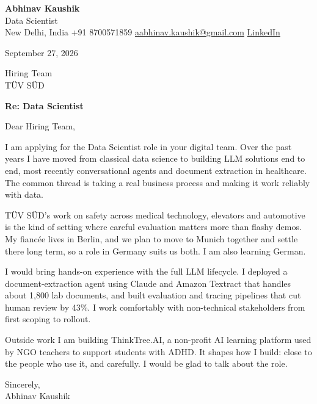 \documentclass[11pt,a4paper]{article}
\begin{document}
{\Large\bfseries Abhinav Kaushik}\\
Data Scientist\\
New Delhi, India \textbar{} +91 8700571859 \textbar{} \href{mailto:aabhinav.kaushik@gmail.com}{aabhinav.kaushik@gmail.com} \textbar{} \href{https://www.linkedin.com/in/abhinav-kaushik10/}{LinkedIn}  

September 27, 2026

Hiring Team\\
TÜV SÜD

\textbf{Re: Data Scientist}

Dear Hiring Team,

I am applying for the Data Scientist role in your digital team. Over the past years I have moved from classical data science to building LLM solutions end to end, most recently conversational agents and document extraction in healthcare. The common thread is taking a real business process and making it work reliably with data.

TÜV SÜD's work on safety across medical technology, elevators and automotive is the kind of setting where careful evaluation matters more than flashy demos. My fiancée lives in Berlin, and we plan to move to Munich together and settle there long term, so a role in Germany suits us both. I am also learning German.

I would bring hands-on experience with the full LLM lifecycle. I deployed a document-extraction agent using Claude and Amazon Textract that handles about 1,800 lab documents, and built evaluation and tracing pipelines that cut human review by 43\%. I work comfortably with non-technical stakeholders from first scoping to rollout.

Outside work I am building ThinkTree.AI, a non-profit AI learning platform used by NGO teachers to support students with ADHD. It shapes how I build: close to the people who use it, and carefully. I would be glad to talk about the role.

Sincerely,\\[4pt]
Abhinav Kaushik
\end{document}
